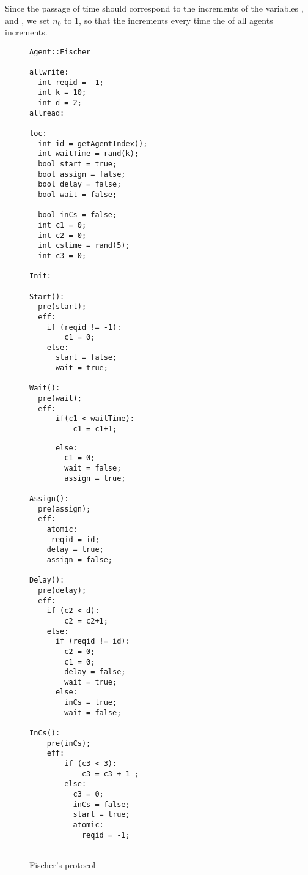 Since the passage of time should correspond to the increments of the variables , and , we set $n_0$ to 1, so that the  increments every time the  of all agents increments.  
\begin{figure}[ht!]
\label{fig:fish}
\noindent\begin{minipage}{.5\textwidth}

\begin{lstlisting}
Agent::Fischer

allwrite:
  int reqid = -1; 
  int k = 10;
  int d = 2;
allread:

loc:
  int id = getAgentIndex();
  int waitTime = rand(k);
  bool start = true;
  bool assign = false;
  bool delay = false;
  bool wait = false;
  
  bool inCs = false;
  int c1 = 0;
  int c2 = 0;
  int cstime = rand(5);
  int c3 = 0;
  
Init:

Start():
  pre(start);
  eff:
  	if (reqid != -1):
    	c1 = 0;
    else:
      start = false;
      wait = true;

Wait():
  pre(wait);
  eff:
      if(c1 < waitTime):
          c1 = c1+1;
 \end{lstlisting}
 \end{minipage}\hfill
\noindent\begin{minipage}{.5\textwidth}

\begin{lstlisting}  
      else:
      	c1 = 0;
        wait = false;
        assign = true;

Assign():
  pre(assign);
  eff:
    atomic:
   	 reqid = id;
    delay = true;
    assign = false;
    
Delay():
  pre(delay);
  eff:
    if (c2 < d):
    	c2 = c2+1;
    else:
      if (reqid != id):
        c2 = 0;
        c1 = 0;
        delay = false;
        wait = true;
      else:
      	inCs = true;
        wait = false;

InCs():
	pre(inCs);
    eff: 
    	if (c3 < 3):
        	c3 = c3 + 1 ;
        else:
          c3 = 0;
          inCs = false;
          start = true;
          atomic:
            reqid = -1;
    	
 \end{lstlisting}
 \end{minipage}\hfill
 \caption{Fischer's  protocol}
 \end{figure}
 
